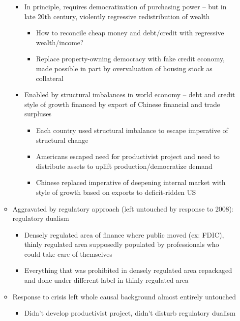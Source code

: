 \begin{itemize}
\begin{itemize}
    \begin{itemize}
    \tightlist
    \item
      In principle, requires democratization of purchasing power -- but
      in late 20th century, violently regressive redistribution of
      wealth

      \begin{itemize}
      \tightlist
      \item
        How to reconcile cheap money and debt/credit with regressive
        wealth/income?
      \item
        Replace property-owning democracy with fake credit economy, made
        possible in part by overvaluation of housing stock as collateral
      \end{itemize}
    \item
      Enabled by structural imbalances in world economy -- debt and
      credit style of growth financed by export of Chinese financial and
      trade surpluses

      \begin{itemize}
      \tightlist
      \item
        Each country used structural imbalance to escape imperative of
        structural change
      \item
        Americans escaped need for productivist project and need to
        distribute assets to uplift production/democratize demand
      \item
        Chinese replaced imperative of deepening internal market with
        style of growth based on exports to deficit-ridden US
      \end{itemize}
    \end{itemize}
  \item
    Aggravated by regulatory approach (left untouched by response to
    2008): regulatory dualism

    \begin{itemize}
    \tightlist
    \item
      Densely regulated area of finance where public moved (ex: FDIC),
      thinly regulated area supposedly populated by professionals who
      could take care of themselves
    \item
      Everything that was prohibited in densely regulated area
      repackaged and done under different label in thinly regulated area
    \end{itemize}
  \item
    Response to crisis left whole causal background almost entirely
    untouched

    \begin{itemize}
    \tightlist
    \item
      Didn't develop productivist project, didn't disturb regulatory
      dualism
    \end{itemize}
  \end{itemize}
\end{itemize}

